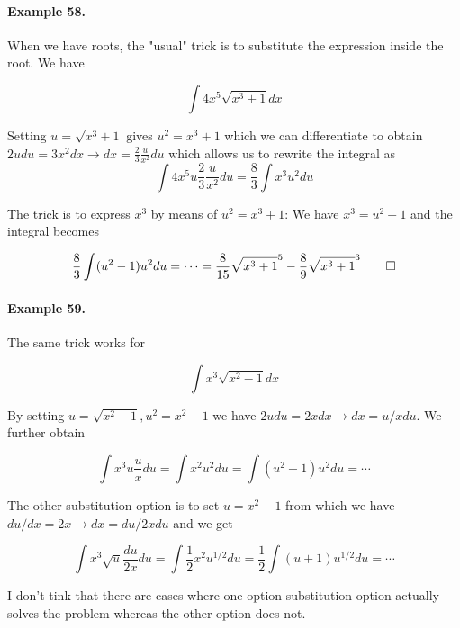 \paragraph{Example 58.} When we have roots, the "usual" trick is to substitute the expression inside the root. We have

\begin{equation*}
    \int 4 x^5 \sqrt{x^3+1} dx
\end{equation*}

Setting $u = \sqrt{x^3+1}$ gives $u^2 = x^3 + 1$ which we can differentiate to obtain $2u du = 3x^2 dx \rightarrow dx = \frac{2}{3} \frac{u}{x^2} du$ which allows us to rewrite the integral as
\begin{equation*}
    \int 4x^5 u \frac{2}{3} \frac{u}{x^2} du = \frac{8}{3} \int x^3 u^2 du 
\end{equation*}

The trick is to express $x^3$ by means of $u^2 = x^3 + 1$: We have $x^3 = u^2 - 1$ and the integral becomes

\begin{equation*}
    \frac{8}{3} \int (u^2 - 1) u^2 du = \cdots = \frac{8}{15} \sqrt{x^3+1}^5 - \frac{8}{9} \sqrt{x^3+1}^3 \qed
\end{equation*}

\paragraph{Example 59.} The same trick works for

\begin{equation*}
    \int x^3 \sqrt{x^2-1} dx
\end{equation*}

By setting $u = \sqrt{x^2-1}, u^2 = x^2-1$ we have $2u du = 2x dx \rightarrow dx = u/x du$. We further obtain

\begin{equation*}
    \int x^3 u \frac{u}{x} du = \int x^2 u^2 du = \int (u^2+1) u^2 du = \cdots
\end{equation*}

The other substitution option is to set $u=x^2 - 1$ from which we have $du/dx = 2x \rightarrow dx = du/2x du$ and we get

\begin{equation*}
    \int x^3 \sqrt{u} \frac{du}{2x}du = \int \frac{1}{2} x^2 u^{1/2} du = \frac{1}{2} \int (u+1)u^{1/2} du = \cdots
\end{equation*}

I don't tink that there are cases where one option substitution option actually solves the problem whereas the other option does not.

